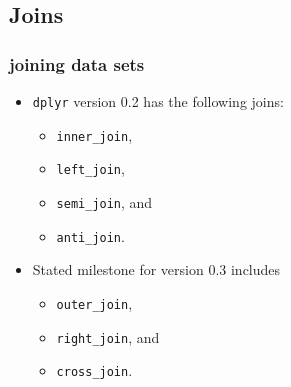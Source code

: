 \documentclass{beamer}\usepackage[]{graphicx}\usepackage[]{color}
\begin{document}
\subsection{Joins}%
\begin{frame}[fragile]
  \frametitle{joining data sets}
  \begin{itemize}
    \item {\tt dplyr} version 0.2 has the following joins:
      \begin{itemize}
        \item {\tt inner\_join}, 
        \item {\tt left\_join}, 
        \item {\tt semi\_join}, and
        \item {\tt anti\_join}.
      \end{itemize}
    \item Stated milestone for version 0.3 includes
      \begin{itemize}
        \item {\tt outer\_join}, 
        \item {\tt right\_join}, and
        \item {\tt cross\_join}.
      \end{itemize}
  \end{itemize}
\end{frame} 
\end{document}
